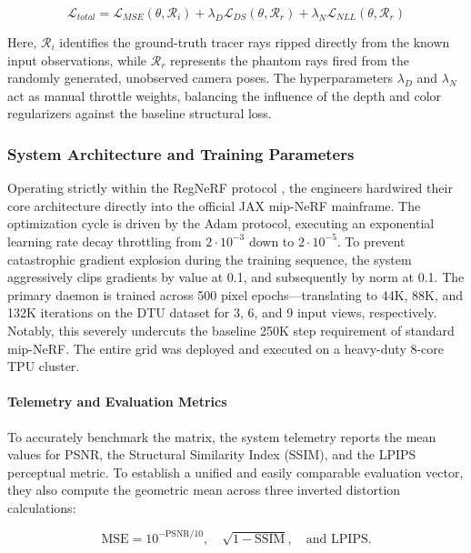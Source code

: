 \begin{equation}
\mathcal{L}_{total} = \mathcal{L}_{MSE}(\theta, \mathcal{R}_i) + \lambda_D \mathcal{L}_{DS}(\theta, \mathcal{R}_r) + \lambda_N \mathcal{L}_{NLL}(\theta, \mathcal{R}_r)
\end{equation}

Here, $\mathcal{R}_i$ identifies the ground-truth tracer rays ripped directly from the known input observations, while $\mathcal{R}_r$ represents the phantom rays fired from the randomly generated, unobserved camera poses. The hyperparameters $\lambda_D$ and $\lambda_N$ act as manual throttle weights, balancing the influence of the depth and color regularizers against the baseline structural loss.

\subsubsection{System Architecture and Training Parameters}
Operating strictly within the RegNeRF protocol  \cite{niemeyer2022regnerf}, the engineers hardwired their core architecture directly into the official JAX mip-NeRF mainframe. The optimization cycle is driven by the Adam protocol, executing an exponential learning rate decay throttling from $2 \cdot 10^{-3}$ down to $2 \cdot 10^{-5}$. To prevent catastrophic gradient explosion during the training sequence, the system aggressively clips gradients by value at 0.1, and subsequently by norm at 0.1. The primary daemon is trained across 500 pixel epochs---translating to 44K, 88K, and 132K iterations on the DTU dataset for 3, 6, and 9 input views, respectively. Notably, this severely undercuts the baseline 250K step requirement of standard mip-NeRF. The entire grid was deployed and executed on a heavy-duty 8-core TPU cluster.

\paragraph{Telemetry and Evaluation Metrics}
To accurately benchmark the matrix, the system telemetry reports the mean values for PSNR, the Structural Similarity Index (SSIM), and the LPIPS perceptual metric. To establish a unified and easily comparable evaluation vector, they also compute the geometric mean across three inverted distortion calculations: 

\begin{equation}
\text{MSE} = 10^{-\text{PSNR}/10}, \quad \sqrt{1-\text{SSIM}}, \quad \text{and LPIPS}.
\end{equation}

